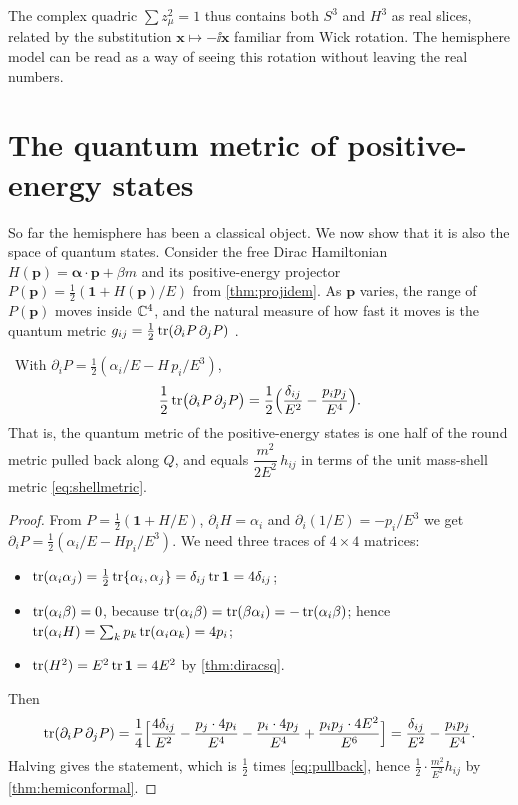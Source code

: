The complex quadric $\sum z_\mu^2=1$ thus contains both $S^3$ and $H^3$ as real slices, related by the substitution $\mathbf x\mapsto-\ii\mathbf x$ familiar from Wick rotation. The hemisphere model can be read as a way of seeing this rotation without leaving the real numbers.

\section{The quantum metric of positive-energy states}

So far the hemisphere has been a classical object. We now show that it is also the space of quantum states. Consider the free Dirac Hamiltonian $H(\mathbf p)=\bm\alpha\cdot\mathbf p+\beta m$ and its positive-energy projector $P(\mathbf p)=\frac12(\mathbf 1+H(\mathbf p)/E)$ from \cref{thm:projidem}. As $\mathbf p$ varies, the range of $P(\mathbf p)$ moves inside $\mathbb{C}^4$, and the natural measure of how fast it moves is the quantum metric $g_{ij}=\frac12\operatorname{tr}(\partial_iP\,\partial_jP)$ \cite{ProvostVallee1980}.

\begin{theorem}\label{thm:quantummetric}\ver\
With $\partial_iP=\frac12(\alpha_i/E-H\,p_i/E^3)$,
\[
\frac12\operatorname{tr}\bigl(\partial_iP\,\partial_jP\bigr)=\frac12\Bigl(\frac{\delta_{ij}}{E^2}-\frac{p_ip_j}{E^4}\Bigr).
\]
That is, the quantum metric of the positive-energy states is one half of the round metric pulled back along $Q$, and equals $\dfrac{m^2}{2E^2}\,h_{ij}$ in terms of the unit mass-shell metric \eqref{eq:shellmetric}.
\end{theorem}
\begin{proof}
From $P=\frac12(\mathbf 1+H/E)$, $\partial_iH=\alpha_i$ and $\partial_i(1/E)=-p_i/E^3$ we get $\partial_iP=\frac12(\alpha_i/E-Hp_i/E^3)$. We need three traces of $4\times4$ matrices:
\begin{itemize}[nosep]
\item $\operatorname{tr}(\alpha_i\alpha_j)=\frac12\operatorname{tr}\{\alpha_i,\alpha_j\}=\delta_{ij}\operatorname{tr}\mathbf 1=4\delta_{ij}$;
\item $\operatorname{tr}(\alpha_i\beta)=0$, because $\operatorname{tr}(\alpha_i\beta)=\operatorname{tr}(\beta\alpha_i)=-\operatorname{tr}(\alpha_i\beta)$; hence $\operatorname{tr}(\alpha_iH)=\sum_kp_k\operatorname{tr}(\alpha_i\alpha_k)=4p_i$;
\item $\operatorname{tr}(H^2)=E^2\operatorname{tr}\mathbf 1=4E^2$ by \cref{thm:diracsq}.
\end{itemize}
Then
\[
\operatorname{tr}(\partial_iP\,\partial_jP)=\frac14\Bigl[\frac{4\delta_{ij}}{E^2}-\frac{p_j\cdot4p_i}{E^4}-\frac{p_i\cdot4p_j}{E^4}+\frac{p_ip_j\cdot4E^2}{E^6}\Bigr]=\frac{\delta_{ij}}{E^2}-\frac{p_ip_j}{E^4}.
\]
Halving gives the statement, which is $\frac12$ times \eqref{eq:pullback}, hence $\frac12\cdot\frac{m^2}{E^2}h_{ij}$ by \cref{thm:hemiconformal}.
\end{proof}


